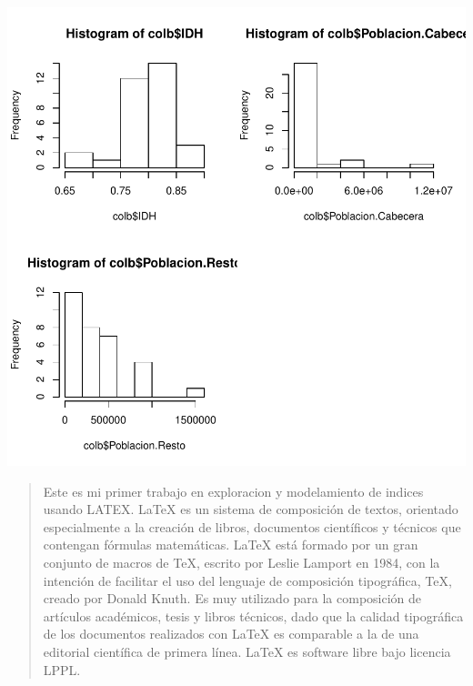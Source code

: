 \documentclass{article}
\begin{document}
\includegraphics{ProyectoFNatiM-barplots}
\clearpage
\begin{abstract}
Este es mi primer trabajo en exploracion y modelamiento de indices usando LATEX. LaTeX es un sistema de composición de textos, orientado especialmente a la creación de libros, documentos científicos y técnicos que contengan fórmulas matemáticas. LaTeX está formado por un gran conjunto de macros de TeX, escrito por Leslie Lamport en 1984, con la intención de facilitar el uso del lenguaje de composición tipográfica, TeX, creado por Donald Knuth. Es muy utilizado para la composición de artículos académicos, tesis y libros técnicos, dado que la calidad tipográfica de los documentos realizados con LaTeX es comparable a la de una editorial científica de primera línea. LaTeX es software libre bajo licencia LPPL.
\end{abstract}
\end{document}
